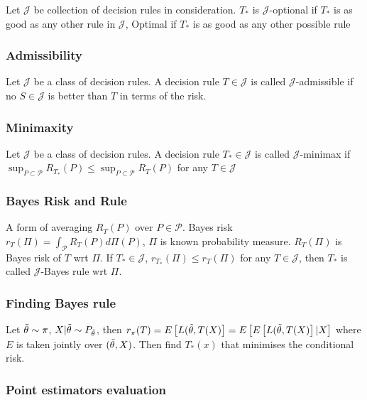 Let $\mathcal{J}$ be collection of decision rules in consideration.
$T_*$ is $\mathcal{J}$-optional if $T_*$ is as good as any other rule in $\mathcal{J}$,
Optimal if $T_*$ is as good as any other possible rule

\subsubsection{Admissibility}

Let $\mathcal{J}$ be a class of decision rules. A decision rule $T\in\mathcal{J}$ is called $\mathcal{J}$-admissible if no $S\in\mathcal{J}$ is better than $T$ in terms of the risk.

\subsubsection{Minimaxity}

Let $\mathcal{J}$ be a class of decision rules. A decision rule $T_*\in\mathcal{J}$ is called $\mathcal{J}$-minimax if $\sup_{P\subset\mathcal{P}}R_{T_*}(P)\leq \sup_{P\subset\mathcal{P}}R_T(P)$ for any $T\in\mathcal{J}$

\subsubsection{Bayes Risk and Rule}

A form of averaging $R_T(P)$ over $P\in\mathcal{P}$.
Bayes risk $r_T(\Pi)=\int_{\mathcal{P}} R_T(P) d\Pi(P)$, $\Pi$ is known probability measure. $R_T(\Pi)$ is Bayes risk of $T$ wrt $\Pi$.
If $T_*\in\mathcal{J}$, $r_{T_*}(\Pi)\leq r_T(\Pi)$ for any $T\in\mathcal{J}$, then $T_*$ is called $\mathcal{J}$-Bayes rule wrt $\Pi$.

\subsubsection{Finding Bayes rule}

Let $\Tilde{\theta}\sim\pi$, $X|\Tilde{\theta}\sim P_{\Tilde{\theta}}$, then
$r_\pi (T) = E\left[L(\Tilde{\theta}, T(X)\right]=E\left[E\left[L(\Tilde{\theta}, T(X)\right]|X\right]$
where $E$ is taken jointly over $(\Tilde{\theta}, X)$.  Then find $T_*(x)$ that minimises the conditional risk.

\subsubsection{Point estimators evaluation}

